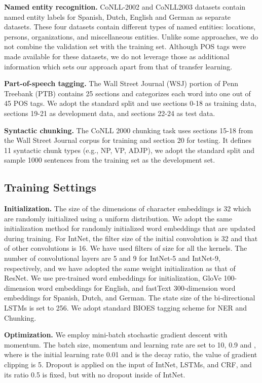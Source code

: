 \documentclass[11pt,a4paper]{article}
\begin{document}
\textbf{Named entity recognition.} CoNLL-2002 and CoNLL2003 datasets \cite{tksintro2002conll,tjongkimsang2003conll} contain named entity labels for Spanish, Dutch, English and German as separate datasets. These four datasets contain different types of named entities: locations, persons,
organizations, and miscellaneous entities. Unlike some approaches, we do not combine the validation set with the training set. Although POS tags were made available for these datasets, we do not leverage those as additional information which sets our approach apart from that of transfer learning. 

\textbf{Part-of-speech tagging.} The Wall Street Journal (WSJ) portion of Penn Treebank (PTB) \cite{Marcus93buildinga} contains 25 sections and categorizes each word into one out of 45 POS tags. We adopt the standard split and use sections 0-18 as training data, sections 19-21 as development data, and sections 22-24 as test data.

\textbf{Syntactic chunking.} The CoNLL 2000 chunking task \cite{tjong2000introduction} uses sections 15-18 from the Wall Street Journal corpus for training and section 20 for testing. It defines 11 syntactic chunk types (e.g., NP, VP, ADJP), we adopt the standard split and sample 1000 sentences from the training set as the development set.


\subsection{Training Settings}

\textbf{Initialization.} The size of the dimensions of character embeddings is 32 which are randomly initialized using a uniform distribution. We adopt the same initialization method for randomly initialized word embeddings that are updated during training. For IntNet, the filter size of the initial convolution is 32 and that of other convolutions is 16. We have used filters of size  for all the kernels. The number of convolutional layers are 5 and 9 for IntNet-5 and IntNet-9, respectively, and we have adopted the same weight initialization as that of ResNet. We use pre-trained word embeddings for initialization, GloVe \cite{pennington2014glove} 100-dimension word embeddings for English, and fastText \cite{bojanowski2017enriching} 300-dimension word embeddings for Spanish, Dutch, and German. The state size of the bi-directional LSTMs is set to 256. We adopt standard BIOES tagging scheme for NER and Chunking.

\textbf{Optimization.} We employ mini-batch stochastic gradient descent with momentum. The batch size, momentum and learning rate are set to 10, 0.9 and , where  is the initial learning rate 0.01 and  is the decay ratio, the value of gradient clipping is 5. Dropout is applied on the input of IntNet, LSTMs, and CRF, and its ratio 0.5 is fixed, but with no dropout inside of IntNet.
\end{document}
